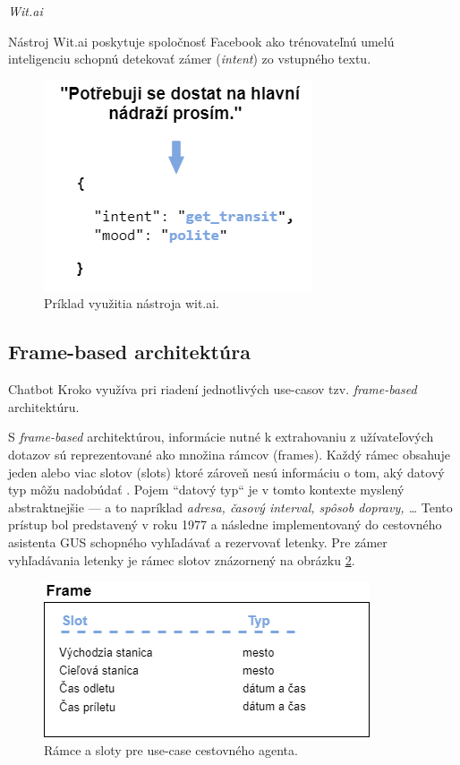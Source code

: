 \documentclass{ExcelAtFIT}
\begin{document}
\vspace{5mm}
\textit{Wit.ai}

\noindent Nástroj Wit.ai poskytuje spoločnosť Facebook ako trénovateľnú umelú inteligenciu schopnú detekovať zámer (\emph{intent}) zo vstupného textu.

\begin{figure}[h]
	\centering
	\includegraphics[width=0.8\linewidth]{witai2.png}
	\caption{Príklad využitia nástroja wit.ai.}
	\label{wit}
\end{figure}


\subsection{Frame-based architektúra}

Chatbot Kroko využíva pri riadení jednotlivých use-casov tzv. \emph{frame-based} architektúru.

S \emph{frame-based} architektúrou, informácie nutné k extrahovaniu z užívateľových dotazov sú reprezentované ako množina rámcov (frames). Každý rámec obsahuje jeden alebo viac slotov (slots) ktoré zároveň nesú informáciu o tom, aký datový typ môžu nadobúdať \cite{jurafsky_2019}. Pojem ``datový typ`` je v tomto kontexte myslený abstraktnejšie --- a to napríklad \emph{adresa, časový interval, spôsob dopravy, \ldots} 
Tento prístup bol predstavený v roku 1977 a následne implementovaný do cestovného asistenta GUS schopného vyhľadávať a rezervovať letenky. Pre zámer vyhľadávania letenky je rámec slotov znázornený na obrázku \ref{alto}.

\begin{figure}[h]
  \centering
  \includegraphics[width=0.95\linewidth]{slots.png}
  \caption{Rámce a sloty pre use-case cestovného agenta.}
  \label{alto}
\end{figure}
\end{document}
